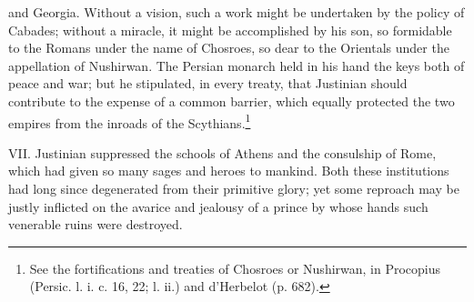 and Georgia. Without a vision, such a work might be undertaken by the policy of Cabades; without a miracle, it might be accomplished by his son, so formidable to the Romans under the name of Chosroes, so dear to the Orientals under the appellation of Nushirwan. The Persian monarch held in his hand the keys both of peace and war; but he stipulated, in every treaty, that Justinian should contribute to the expense of a common barrier, which equally protected the two empires from the inroads of the Scythians.\footnote{See the fortifications and treaties of Chosroes or Nushirwan, in Procopius (Persic. l. i. c. 16, 22; l. ii.) and d\texthebrew{}’Herbelot (p. 682).}

VII. Justinian suppressed the schools of Athens and the consulship of Rome, which had given so many sages and heroes to mankind. Both these institutions had long since degenerated from their primitive glory; yet some reproach may be justly inflicted on the avarice and jealousy of a prince by whose hands such venerable ruins were destroyed.

